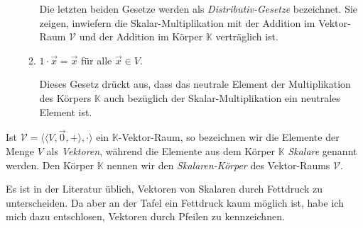 \begin{Definition}
\begin{enumerate}
\begin{enumerate}
            Die letzten beiden Gesetze werden als {\emph{\color{blue}Distributiv-Gesetze}}
            bezeichnet.  Sie zeigen, inwiefern die Skalar-Multiplikation mit der Addition im Vektor-Raum
            $\mathcal{V}$ und der Addition im K\"{o}rper $\mathbb{K}$ vertr\"{a}glich ist.
      \item $1 \cdot \vec{x} = \vec{x}$ \quad f\"ur alle $\vec{x} \in V$.  

            Dieses Gesetz dr\"{u}ckt aus, dass das neutrale Element der Multiplikation des K\"{o}rpers
            $\mathbb{K}$ auch bez\"{u}glich der Skalar-Multiplikation ein neutrales Element ist. 
      \end{enumerate}
\end{enumerate} 
Ist $\mathcal{V} = \bigl\langle \langle V, \vec{0}, + \rangle, \cdot \bigr\rangle$  ein $\mathbb{K}$-Vektor-Raum, so bezeichnen wir die Elemente der Menge
$V$ als {\emph{\color{blue}Vektoren}}, w\"{a}hrend die Elemente aus dem K\"{o}rper $\mathbb{K}$ 
{\emph{\color{blue}Skalare}} genannt werden.  Den K\"{o}rper $\mathbb{K}$ nennen wir den
{\emph{\color{blue}Skalaren-K\"{o}rper}} des Vektor-Raums $\mathcal{V}$.  
\eoxs
\end{Definition}

\remark
Es ist in der Literatur \"{u}blich, Vektoren von Skalaren durch Fettdruck zu unterscheiden.  
Da aber an der Tafel ein Fettdruck kaum m\"{o}glich ist, habe ich mich dazu entschlosen, 
Vektoren durch Pfeilen zu kennzeichnen.
\eoxs


